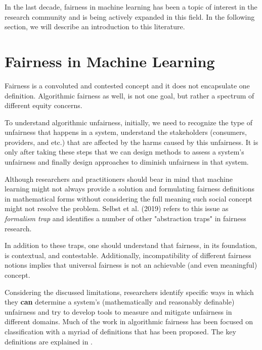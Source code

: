     In the last decade, fairness in machine learning has been a topic of interest in the research community and is being actively expanded in this field. In the following section, we will describe an introduction to this literature.

\section{Fairness in Machine Learning}
\label{sec:fair_ml}
    
    Fairness is a convoluted and contested concept and it does not encapsulate one definition. Algorithmic fairness as well, is not one goal, but rather a spectrum of different equity concerns.
    
    To understand algorithmic unfairness, initially, we need to recognize the type of unfairness that happens in a system, understand the stakeholders (consumers, providers, and etc.) that are affected by the harms caused by this unfairness. It is only after taking these steps that we can design methods to assess a system's unfairness and finally design approaches to diminish unfairness in that system.
    
    Although researchers and practitioners should bear in mind that machine learning might not always provide a solution and formulating fairness definitions in mathematical forms without considering the full meaning such social concept might not resolve the problem. Selbst et al. (2019) \cite{selbst2019fairness} refers to this issue as \textit{formalism trap} and identifies a number of other "abstraction traps" in fairness research.
    
    In addition to these traps, one should understand that fairness, in its foundation, is contextual, and contestable. Additionally, incompatibility of different fairness notions \cite{friedler-impossibility-2021} implies that universal fairness is not an achievable (and even meaningful) concept.
    
    Considering the discussed limitations, researchers identify specific ways in which they \textbf{can} determine a system's (mathematically and reasonably definable) unfairness and try to develop tools to measure and mitigate unfairness in different domains. Much of the work in algorithmic fairness has been focused on classification with a myriad of definitions that has been proposed. The key definitions are explained in \cite{mitchell2021algorithmic,barocas2016big,barocas2018fairness}.

